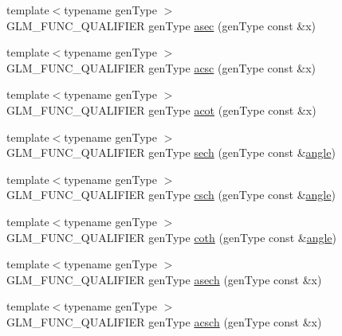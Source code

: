\begin{DoxyCompactItemize}
\item 
{\footnotesize template$<$typename gen\+Type $>$ }\\G\+L\+M\+\_\+\+F\+U\+N\+C\+\_\+\+Q\+U\+A\+L\+I\+F\+I\+ER gen\+Type \hyperlink{group__gtc__reciprocal_gac9761980e09149002a466ca131a4bcac}{asec} (gen\+Type const \&x)
\item 
{\footnotesize template$<$typename gen\+Type $>$ }\\G\+L\+M\+\_\+\+F\+U\+N\+C\+\_\+\+Q\+U\+A\+L\+I\+F\+I\+ER gen\+Type \hyperlink{group__gtc__reciprocal_ga135e8f6b36bb85b5f7d8067e6b890e4d}{acsc} (gen\+Type const \&x)
\item 
{\footnotesize template$<$typename gen\+Type $>$ }\\G\+L\+M\+\_\+\+F\+U\+N\+C\+\_\+\+Q\+U\+A\+L\+I\+F\+I\+ER gen\+Type \hyperlink{group__gtc__reciprocal_ga97d029f989f849b62915b068c264246b}{acot} (gen\+Type const \&x)
\item 
{\footnotesize template$<$typename gen\+Type $>$ }\\G\+L\+M\+\_\+\+F\+U\+N\+C\+\_\+\+Q\+U\+A\+L\+I\+F\+I\+ER gen\+Type \hyperlink{group__gtc__reciprocal_gaaa698b992c63f454a3a1a1baa2773a3c}{sech} (gen\+Type const \&\hyperlink{group__gtc__quaternion_ga23a3fc7ada5bbb665ff84c92c6e0542c}{angle})
\item 
{\footnotesize template$<$typename gen\+Type $>$ }\\G\+L\+M\+\_\+\+F\+U\+N\+C\+\_\+\+Q\+U\+A\+L\+I\+F\+I\+ER gen\+Type \hyperlink{group__gtc__reciprocal_ga00404a9cdf62023792d1d0afedd7f896}{csch} (gen\+Type const \&\hyperlink{group__gtc__quaternion_ga23a3fc7ada5bbb665ff84c92c6e0542c}{angle})
\item 
{\footnotesize template$<$typename gen\+Type $>$ }\\G\+L\+M\+\_\+\+F\+U\+N\+C\+\_\+\+Q\+U\+A\+L\+I\+F\+I\+ER gen\+Type \hyperlink{group__gtc__reciprocal_gae2f1e6f7c360dda452b88e0c492d6f4d}{coth} (gen\+Type const \&\hyperlink{group__gtc__quaternion_ga23a3fc7ada5bbb665ff84c92c6e0542c}{angle})
\item 
{\footnotesize template$<$typename gen\+Type $>$ }\\G\+L\+M\+\_\+\+F\+U\+N\+C\+\_\+\+Q\+U\+A\+L\+I\+F\+I\+ER gen\+Type \hyperlink{group__gtc__reciprocal_ga450f3bf1c04751198994d26d92ac2a63}{asech} (gen\+Type const \&x)
\item 
{\footnotesize template$<$typename gen\+Type $>$ }\\G\+L\+M\+\_\+\+F\+U\+N\+C\+\_\+\+Q\+U\+A\+L\+I\+F\+I\+ER gen\+Type \hyperlink{group__gtc__reciprocal_ga418b31539e1a69c262712f2c7a4f27eb}{acsch} (gen\+Type const \&x)

\end{DoxyCompactItemize}
